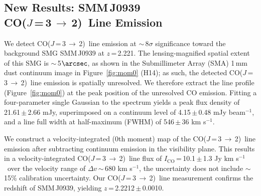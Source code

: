 \documentclass[twocolumn,apj,numberedappendix]{emulateapj}
\newcommand{\CO}{\mbox{CO($J$\,=\,3\,$\rightarrow$\,2) }}
\newcommand{\pmOne}{\mbox{$^{-1}$}}
\begin{document}
\subsection{New Results: SMM\,J0939\\ \CO Line Emission}
We detect \CO line emission at $\sim$\,8$\sigma$ significance toward the background SMG SMM\,J0939 at $z$\,=\,2.221.
The lensing-magnified spatial extent of this SMG is $\sim$\,5$\arcsec$, as shown in the Submillimeter Array (SMA) 1\,mm dust continuum image in Figure~\ref{fig:mom0} (H14); as such,
the detected \CO line emission is spatially unresolved. We therefore extract the line profile (Figure~\ref{fig:mom0}) at the peak position of the unresolved
CO emission. Fitting a four-parameter single Gaussian to the spectrum yields a peak flux density of 21.61\,$\pm$\,2.66\,\,mJy, superimposed on a
continuum level of 4.15\,$\pm$\,0.48\,\,mJy beam\pmOne, and a line full width at half-maximum (FWHM) of 546\,$\pm$\,36\,\,km\,\,s\pmOne.  \par
We construct a velocity-integrated (0th moment) map of the \CO line
emission after subtracting continuum emission in the visibility plane. This results in a velocity-integrated \CO line flux of $I_\textrm{CO}$\,=\,10.1\,$\pm$\,1.3 Jy km\,\,s\pmOne\ over the velocity range of $\Delta v$\,$\sim$\,680 km\,\,s\pmOne, the uncertainty does not include $\sim$\,15\% calibration
uncertainty. Our \CO line measurement confirms the redshift of SMM\,J0939, yielding $z$\,=\,2.2212\,$\pm$\,0.0010.
\end{document}
